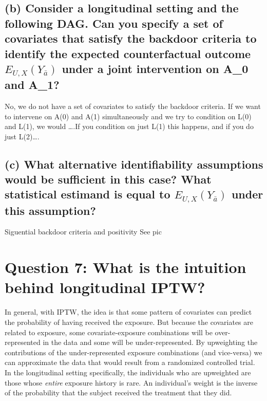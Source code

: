 \documentclass[]{article}
\begin{document}
\subsection{\texorpdfstring{(b) Consider a longitudinal setting and the
following DAG. Can you specify a set of covariates that satisfy the
backdoor criteria to identify the expected counterfactual outcome
\(E_{U,X}(Y_{\bar{a}})\) under a joint intervention on A\_0 and
A\_1?}{(b) Consider a longitudinal setting and the following DAG. Can you specify a set of covariates that satisfy the backdoor criteria to identify the expected counterfactual outcome E\_\{U,X\}(Y\_\{\textbackslash{}bar\{a\}\}) under a joint intervention on A\_0 and A\_1?}}\label{b-consider-a-longitudinal-setting-and-the-following-dag.-can-you-specify-a-set-of-covariates-that-satisfy-the-backdoor-criteria-to-identify-the-expected-counterfactual-outcome-e_uxy_bara-under-a-joint-intervention-on-a_0-and-a_1}

No, we do not have a set of covariates to satisfy the backdoor criteria.
If we want to intervene on A(0) and A(1) simultaneously and we try to
condition on L(0) and L(1), we would \ldots{}.If you condition on just
L(1) this happens, and if you do just L(2)\ldots{}.

\subsection{\texorpdfstring{(c) What alternative identifiability
assumptions would be sufficient in this case? What statistical estimand
is equal to \(E_{U,X}(Y_{\bar{a}})\) under this
assumption?}{(c) What alternative identifiability assumptions would be sufficient in this case? What statistical estimand is equal to E\_\{U,X\}(Y\_\{\textbackslash{}bar\{a\}\}) under this assumption?}}\label{c-what-alternative-identifiability-assumptions-would-be-sufficient-in-this-case-what-statistical-estimand-is-equal-to-e_uxy_bara-under-this-assumption}

Siguential backdoor criteria and positivity See pic

\section{Question 7: What is the intuition behind longitudinal
IPTW?}\label{question-7-what-is-the-intuition-behind-longitudinal-iptw}

In general, with IPTW, the idea is that some pattern of covariates can
predict the probability of having received the exposure. But because the
covariates are related to exposure, some covariate-exposure combinations
will be over-represented in the data and some will be under-represented.
By upweighting the contributions of the under-represented exposure
combinations (and vice-versa) we can approximate the data that would
result from a randomized controlled trial. In the longitudinal setting
specifically, the individuals who are upweighted are those whose
\emph{entire} exposure history is rare. An individual's weight is the
inverse of the probability that the subject received the treatment that
they did.
\end{document}
